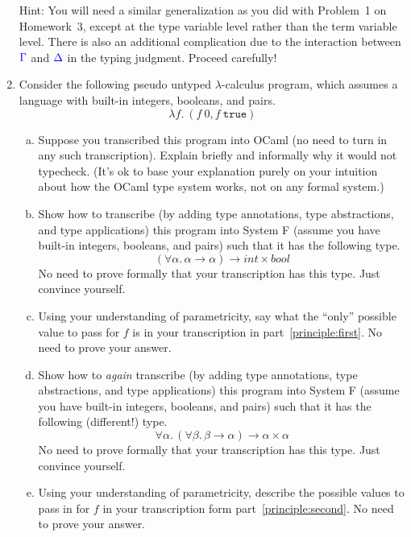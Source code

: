 \documentclass{article}
\theoremstyle{definition}
\newcommand{\meta}[1]{{\color{blue}#1}}
\begin{document}
\begin{enumerate}[start=1,label={{\bf Problem \arabic*}.},ref=\arabic*,left=0pt..0pt,widest*=10,align=left,itemindent=*]
  Hint: You will need a similar generalization as you did with Problem~1 on
  Homework~3, except at the type variable level rather than the term variable
  level. There is also an additional complication due to the interaction between
  $\meta{\Gamma}$ and $\meta{\Delta}$ in the typing judgment. Proceed carefully!
\item Consider the following pseudo untyped $\lambda$-calculus program, which assumes a language with built-in integers, booleans, and pairs.
  \[
    \lambda f.\ (f\ 0, f\ \mathtt{true})
  \]
  \begin{enumerate}[(a),left=1em]
  \item Suppose you transcribed this program into OCaml (no need to turn in any
    such transcription). Explain briefly and informally why it would not
    typecheck. (It's ok to base your explanation purely on your intuition about
    how the OCaml type system works, not on any formal system.)
  \item\label{principle:first} Show how to transcribe (by adding type
    annotations, type abstractions, and type applications) this program into
    System F (assume you have built-in integers, booleans, and pairs) such that
    it has the following type.
    \[
      (\forall\alpha.\, \alpha\to\alpha)\to int\times bool
    \]
    No need to prove formally that your transcription has this type. Just convince yourself.
  \item Using your understanding of parametricity, say what the ``only''
    possible value to pass for $f$ is in your transcription in part~\ref{principle:first}.
    No need to prove your answer.
  \item\label{principle:second} Show how to \emph{again} transcribe (by adding type
    annotations, type abstractions, and type applications) this program into
    System F (assume you have built-in integers, booleans, and pairs) such that
    it has the following (different!) type.
    \[
      \forall\alpha.\, (\forall\beta.\, \beta\to\alpha)\to \alpha\times\alpha
    \]
    No need to prove formally that your transcription has this type. Just convince yourself.
  \item\label{principle:second-f} Using your understanding of parametricity, describe the possible values
    to pass in for $f$ in your transcription form part~\ref{principle:second}.
    No need to prove your answer.


\end{enumerate}
\end{enumerate}
\end{document}
